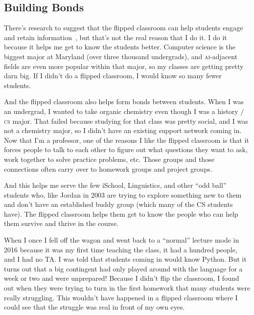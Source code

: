 \documentclass[11pt]{amsart}
\newcommand{\abr}[1]{\textsc{#1}}
\begin{document}
\subsection{Building Bonds}

There's research to suggest that the flipped classroom can help
students engage and retain information~\cite{Zuber-16}, but that's not
the real reason that I do it.
%
I do it because it helps me get to know the students better.  Computer
science is the biggest major at Maryland (over three thousand undergrads), and
\abr{ai}-adjacent fields are even more popular within that major, so my
classes are getting pretty darn big.
%
If I didn't do a flipped
classroom, I would know so many fewer students.

And the flipped classroom also helps form bonds between students.
%
When I was an undergrad, I wanted to take organic chemistry even
though I was a history / \abr{cs} major.
%
That failed because studying for
that class was pretty social, and I was not a chemistry major, so I
didn't have an existing support network coming in.
%
Now that I'm a
professor, one of the reasons I like the flipped classroom is that it
forces people to talk to each other to figure out what questions they
want to ask, work together to solve practice problems, etc.
%
Those
groups and those connections often carry over to homework groups and
project groups.

And this helps me serve the few iSchool, Linguistics, and other ``odd
ball'' students who, like Jordan in 2003 are trying to explore
something new to them and don't have an established buddy group (which
many of the CS students have).  The flipped classroom helps them get
to know the people who can help them survive and thrive in the course.

When I once I fell off the wagon and went back to a ``normal'' lecture
mode in 2016 because it was my first time teaching the class, it had a
hundred people, and I had no TA.  I was told that students coming in
would know Python.  But it turns out that a big contingent had only
played around with the language for a week or two and were unprepared!
Because I didn't flip the classroom, I found out when they were trying
to turn in the first homework that many students were really
struggling.  This wouldn't have happened in a flipped classroom where
I could see that the struggle was real in front of my own eyes.
\end{document}
